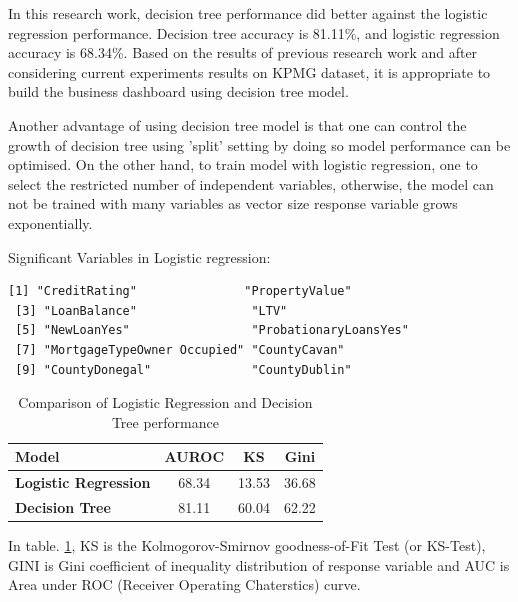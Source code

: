 In this research work, decision tree performance did better against the logistic regression performance. Decision tree accuracy is 81.11\%, and logistic regression accuracy is 68.34\%. Based on the results of previous research work and after considering current experiments results on KPMG dataset, it is appropriate to build the business dashboard using decision tree model.

Another advantage of using decision tree model is that one can control the growth of decision tree using 'split' setting by doing so model performance can be optimised. On the other hand,  to train model with logistic regression, one to select the restricted number of independent variables, otherwise, the model can not be trained with many variables as vector size response variable grows exponentially.

Significant Variables in Logistic regression:
\begin{verbatim}
[1] "CreditRating"               "PropertyValue"             
 [3] "LoanBalance"                "LTV"                       
 [5] "NewLoanYes"                 "ProbationaryLoansYes"      
 [7] "MortgageTypeOwner Occupied" "CountyCavan"               
 [9] "CountyDonegal"              "CountyDublin"              

\end{verbatim}

\begin{table}[!htb]
\centering
\caption{Comparison of Logistic Regression and Decision Tree performance}
\label{table:results}
\begin{tabular}{@{}lccc@{}}
\toprule
\textbf{Model}               & \textbf{AUROC} & \textbf{KS} & \textbf{Gini} \\ \midrule
\textbf{Logistic Regression} & 68.34          & 13.53       & 36.68         \\
\textbf{Decision Tree}       & 81.11          & 60.04       & 62.22         \\ \bottomrule
\end{tabular}
\end{table}

In table. \ref{table:results}, KS is the Kolmogorov-Smirnov goodness-of-Fit Test (or KS-Test), GINI is Gini coefficient of inequality distribution of response variable and AUC is Area under ROC (Receiver Operating Chaterstics) curve.\\

